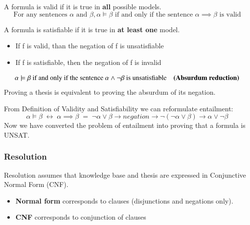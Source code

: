 \begin{tcolorbox}[colback=red!5!white,colframe=red!75!black,title=\textbf{Validity Definition}, label=def:validity]
    \label{def:val}
    A formula is valid if it is true in \textbf{all} possible models.
    \begin{equation*}
        \text{For any sentences } \alpha \text{ and } \beta, \alpha \models \beta \text{ if and only if the sentence }\alpha\implies\beta \text{ is valid}
    \end{equation*}
\end{tcolorbox}
\begin{tcolorbox}[label=def:sat,colback=red!5!white,colframe=red!75!black,title=\textbf{Satisfiability Definition}]
    \label{def:sat}
    A formula is satisfiable if it is true in \textbf{at least one} model.
    \begin{itemize}
        \item If f is valid, than the negation of f is unsatisfiable
        \item If f is satisfiable, then the negation of f is invalid
    \end{itemize}
    \begin{equation*}
        \alpha \models \beta \text{ if and only if the sentence }\alpha\land\lnot\beta \text{ is unsatisfiable} \quad \text{\textbf{(Absurdum reduction)}}
    \end{equation*}
    Proving a thesis is equivalent to proving the absurdum of its negation.
\end{tcolorbox}
From Definition of Validity and Satisfiability we can reformulate entailment:
\begin{equation*}
    \alpha\models\beta\;\leftrightarrow\;\alpha\implies\beta\;=\;\lnot\alpha\lor\beta\rightarrow negation \rightarrow \lnot(\lnot\alpha\lor\beta)\rightarrow \alpha\lor\lnot\beta
\end{equation*}
Now we have converted the problem of entailment into proving that a formula is UNSAT.

\subsubsection{Resolution}
Resolution assumes that knowledge base and thesis are expressed in Conjunctive
Normal Form (CNF).
\begin{itemize}
    \item \textbf{Normal form} corresponds to clauses (disjunctions and negations only).
    \item \textbf{CNF} corresponds to conjunction of clauses
\end{itemize}

